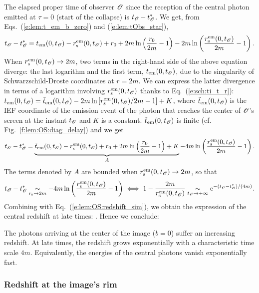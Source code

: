 The elapsed proper time of observer $\mathscr{O}$
since the reception of the central photon emitted
at $\tau = 0$ (start of the collapse) is $t_{\mathscr{O}} - t_{\mathscr{O}}^*$.
We get, from Eqs.~(\ref{e:lem:t_em_b_zero}) and (\ref{e:lem:tObs_star}),
\[
    t_{\mathscr{O}} - t_{\mathscr{O}}^* =  t_{\rm em}(0, t_{\mathscr{O}}) - r_{\rm s}^{\rm em}(0,t_{\mathscr{O}}) + r_0
        + 2m \ln\left(\frac{r_0}{2m} - 1 \right)
        - 2m \ln\left(\frac{r_{\rm s}^{\rm em}(0,t_{\mathscr{O}})}{2m} - 1 \right) .
\]
When $r_{\rm s}^{\rm em}(0,t_{\mathscr{O}}) \to 2m$, two terms in the right-hand side
of the above equation diverge: the last logarithm and the first term,
$t_{\rm em}(0, t_{\mathscr{O}})$, due to the singularity of Schwarzschild-Droste coordinates
at $r=2m$. We can express the latter divergence in terms of a logarithm
involving $r_{\rm s}^{\rm em}(0,t_{\mathscr{O}})$ thanks to Eq.~(\ref{e:sch:ti_t_r}):
$t_{\rm em}(0, t_{\mathscr{O}}) = {\tilde t}_{\rm em}(0,t_{\mathscr{O}}) - 2m
\ln\left[ {r_{\rm s}^{\rm em}(0,t_{\mathscr{O}})}/{2m}  - 1 \right] + K$,
where ${\tilde t}_{\rm em}(0,t_{\mathscr{O}})$ is the IEF coordinate
of the emission event of the photon that reaches the center of $\mathscr{O}$'s screen
at the instant $t_{\mathscr{O}}$
and $K$ is a constant.
${\tilde t}_{\rm em}(0,t_{\mathscr{O}})$ is finite (cf. Fig.~\ref{f:lem:OS:diag_delay})
and we get
\[
    t_{\mathscr{O}} - t_{\mathscr{O}}^* = \underbrace{{\tilde t}_{\rm em}(0,t_{\mathscr{O}}) - r_{\rm s}^{\rm em}(0,t_{\mathscr{O}}) + r_0
    + 2 m \ln \left( \frac{r_0}{2m} - 1 \right) + K}_{A}
    -  4 m \ln \left( \frac{r_{\rm s}^{\rm em}(0,t_{\mathscr{O}})}{2 m}  - 1 \right) .
\]
The terms denoted by $A$ are bounded when $r_{\rm s}^{\rm em}(0,t_{\mathscr{O}}) \to 2m$, so that
\[
    t_{\mathscr{O}} - t_{\mathscr{O}}^*  \underset{r_{\rm s}\to 2m}{\sim} -  4 m \ln \left( \frac{r_{\rm s}^{\rm em}(0,t_{\mathscr{O}})}{2 m}  - 1 \right)
    \iff 1 - \frac{2m}{r_{\rm s}^{\rm em}(0,t_{\mathscr{O}})}
    \underset{t_{\mathscr{O}} \to +\infty}{\sim} \mathrm{e}^{-(t_{\mathscr{O}} - t_{\mathscr{O}}^*)/(4 m)} .
\]
Combining with Eq.~(\ref{e:lem:OS:redshift_sim}), we obtain the expression
of the central redshift at late times:
\be \label{e:lem:central_redshift}
    .
\ee
Hence we conclude:
\begin{greybox}
The photons arriving at the center of the image ($b=0$) suffer an
increasing redshift. At late times, the redshift grows exponentially
with a characteristic time scale $4 m$. Equivalently, the energies of the central photons
vanish exponentially fast.
\end{greybox}

\subsubsection{Redshift at the image's rim}

